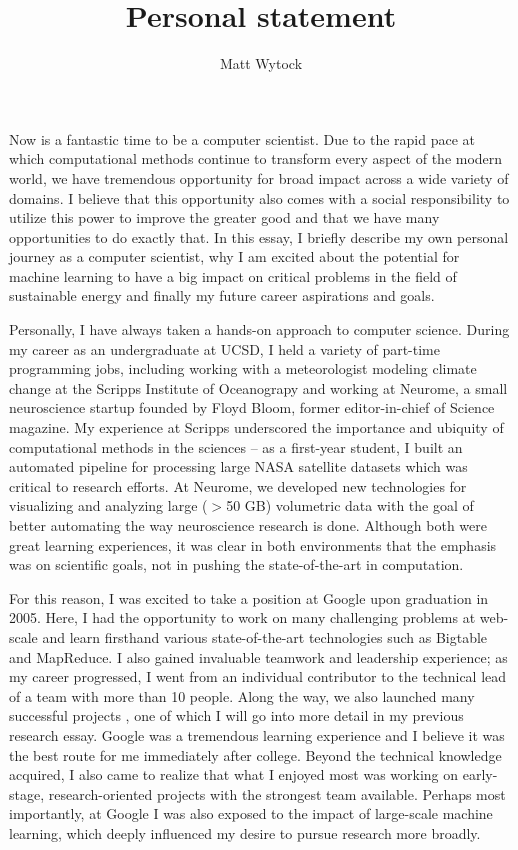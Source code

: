 \documentclass[12pt]{article}
\title{Personal statement}
\author{Matt Wytock}
\begin{document}
Now is a fantastic time to be a computer scientist. Due to the rapid pace at which computational methods continue to transform every aspect of the modern world, we have tremendous opportunity for broad impact across a wide variety of domains. I believe that this opportunity also comes with a social responsibility to utilize this power to improve the greater good and that we have many opportunities to do exactly that. In this essay, I briefly describe my own personal journey as a computer scientist, why I am excited about the potential for machine learning to have a big impact on critical problems in the field of sustainable energy and finally my future career aspirations and goals.

Personally, I have always taken a hands-on approach to computer science. During my career as an undergraduate at UCSD, I held a variety of part-time programming jobs, including working with a meteorologist modeling climate change at the Scripps Institute of Oceanograpy and working at Neurome, a small neuroscience startup founded by Floyd Bloom, former editor-in-chief of Science magazine. My experience at Scripps underscored the importance and ubiquity of computational methods in the sciences -- as a first-year student, I built an automated pipeline for processing large NASA satellite datasets which was critical to research efforts. At Neurome, we developed new technologies for visualizing and analyzing large ($>$50 GB) volumetric data with the goal of better automating the way neuroscience research is done. Although both were great learning experiences, it was clear in both environments that the emphasis was on scientific goals, not in pushing the state-of-the-art in computation.

For this reason, I was excited to take a position at Google upon graduation in 2005. Here, I had the opportunity to work on many challenging problems at web-scale and learn firsthand various state-of-the-art technologies such as Bigtable and MapReduce. I also gained invaluable teamwork and leadership experience; as my career progressed, I went from an individual contributor to the technical lead of a team with more than 10 people. Along the way, we also launched many successful projects \cite{claiborne,gultekin,mayer,seth}, one of which I will go into more detail in my previous research essay. Google was a tremendous learning experience and I believe it was the best route for me immediately after college. Beyond the technical knowledge acquired, I also came to realize that what I enjoyed most was working on early-stage, research-oriented projects with the strongest team available. Perhaps most importantly, at Google I was also exposed to the impact of large-scale machine learning, which deeply influenced my desire to pursue research more broadly. 
\end{document}

